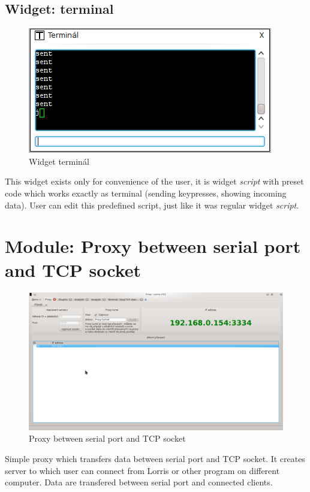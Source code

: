 \documentclass[12pt, a4paper, oneside]{article}
\newcommand{\It}{\textit}  %
\begin{document}
\subsection{Widget: terminal}
\begin{figure}[H]
\begin{center}
\includegraphics[scale=0.70]{img/w_terminal.png}
\caption{Widget terminál}
\end{center}
\end{figure}
This widget exists only for convenience of the user, it is widget \It{script} with preset code which works exactly as terminal (sending keypresses, showing incoming data). User can edit this predefined script, just like it was regular widget \It{script}.

\newpage
\setlength{\voffset}{0mm} %
\pagestyle{plain}
\section{Module: Proxy between serial port and TCP socket}
\begin{figure}[H]
\begin{center}
\includegraphics[width=\textwidth]{img/proxy.png}
\caption{Proxy between serial port and TCP socket}
\label{Shupito}
\end{center}
\end{figure}
Simple proxy which transfers data between serial port and TCP socket. It creates server to which user can connect from Lorris or other program on different computer. Data are transfered between serial port and connected clients.
\end{document}
